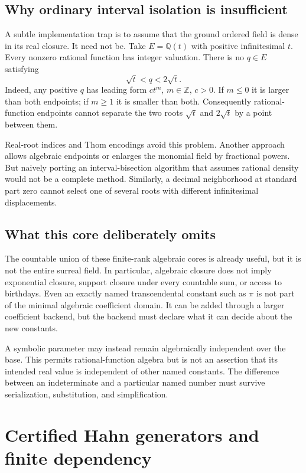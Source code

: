 \documentclass[11pt,letterpaper]{article}
\numberwithin{equation}{section}
\theoremstyle{definition}
\theoremstyle{remark}\newtheorem{remark}[theorem]{Remark}
\newcommand{\Q}{\mathbb Q}
\newcommand{\Z}{\mathbb Z}
\begin{document}
\subsection{Why ordinary interval isolation is insufficient}
\label{subsec:nondense}
A subtle implementation trap is to assume that the ground ordered field is
dense in its real closure. It need not be. Take $E=\Q(t)$ with positive
infinitesimal $t$. Every nonzero rational function has integer valuation.
There is no $q\in E$ satisfying
\[
 \sqrt t<q<2\sqrt t.
\]
Indeed, any positive $q$ has leading form $ct^m$, $m\in\Z$, $c>0$. If
$m\le0$ it is larger than both endpoints; if $m\ge1$ it is smaller than both.
Consequently rational-function endpoints cannot separate the two roots
$\sqrt t$ and $2\sqrt t$ by a point between them.

Real-root indices and Thom encodings avoid this problem. Another approach
allows algebraic endpoints or enlarges the monomial field by fractional
powers. But naively porting an interval-bisection algorithm that assumes
rational density would not be a complete method. Similarly, a decimal
neighborhood at standard part zero cannot select one of several roots with
different infinitesimal displacements.

\subsection{What this core deliberately omits}
The countable union of these finite-rank algebraic cores is already useful,
but it is not the entire surreal field. In particular, algebraic closure does
not imply exponential closure, support closure under every countable sum,
or access to birthdays. Even an exactly named transcendental constant such as
$\pi$ is not part of the minimal algebraic coefficient domain. It can be added
through a larger coefficient backend, but the backend must declare what it
can decide about the new constants.

A symbolic parameter may instead remain algebraically independent over the
base. This permits rational-function algebra but is not an assertion that its
intended real value is independent of other named constants. The difference
between an indeterminate and a particular named number must survive
serialization, substitution, and simplification.

\section{Certified Hahn generators and finite dependency}
\label{sec:support}
\end{document}
